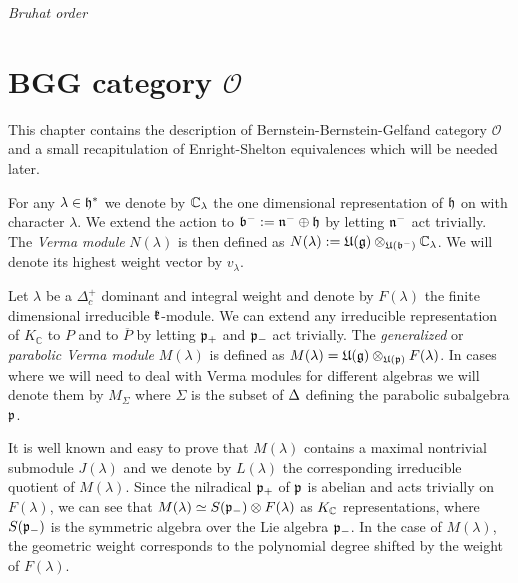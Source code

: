 \emph{Bruhat order}%

\section[BGG category O]{BGG category $\mathcal{O}$}

This chapter contains the description of Bernstein-Bernstein-Gelfand category $\mathcal{O}$ and a small recapitulation of Enright-Shelton equivalences which will be needed later.

For any $\lambda\in\mathfrak{h}^*$ we denote by $\mathbb{C}_\lambda$ the one dimensional representation of $\mathfrak{h}$ on with character $\lambda$. We extend the action to $\mathfrak{b}^- := \mathfrak{n}^-\oplus\mathfrak{h}$ by letting $\mathfrak{n}^-$ act trivially. The \emph{Verma module} $N(\lambda)$ is then defined as $N(\lambda) := \mathfrak{U(g)}\otimes_{\mathfrak{U(b^-)}} \mathbb{C}_\lambda$. We will denote its highest weight vector by $v_\lambda$.

Let $\lambda$ be a $\Delta_c^+$ dominant and integral weight and denote by $F(\lambda)$ the finite dimensional irreducible $\mathfrak{k}$-module.  We can extend any irreducible representation of $K_\mathbb{C}$ to $P$ and to $\overline{P}$ by letting $\mathfrak{p}_+$ and $\mathfrak{p}_-$ act trivially. The \emph{generalized} or \emph{parabolic Verma module} $M(\lambda)$ is defined as $M(\lambda) = \mathfrak{U}(\mathfrak{g}) \otimes_{\mathfrak{U}(\mathfrak{p})} F(\lambda)$. In cases where we will need to deal with Verma modules for different algebras we will denote them by $M_\Sigma$ where $\Sigma$ is the subset of $\Delta$ defining the parabolic subalgebra $\mathfrak{p}$. 

 It is well known and easy to prove that $M(\lambda)$ contains a maximal nontrivial submodule $J(\lambda)$ and we denote by $L(\lambda)$ the corresponding irreducible quotient of $M(\lambda)$. Since the nilradical $\mathfrak{p}_+$ of $\mathfrak{p}$ is abelian and acts trivially on $F(\lambda)$, we can see that $M(\lambda) \simeq S(\mathfrak{p}_-)\otimes F(\lambda)$ as $K_{\mathbb{C}}$ representations, where $S(\mathfrak{p}_-)$ is the symmetric algebra  over the Lie algebra $\mathfrak{p}_-$.
In the case of $M(\lambda)$, the geometric weight corresponds to the polynomial degree shifted by the weight of $F(\lambda)$.%

